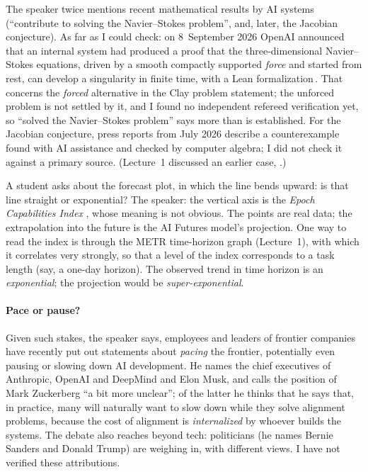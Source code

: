 \begin{beyond}
The speaker twice mentions recent mathematical results by AI systems (``contribute to solving the Navier--Stokes problem'', and, later, the Jacobian conjecture). As far as I could check: on 8~September 2026 OpenAI announced that an internal system had produced a proof that the three-dimensional Navier--Stokes equations, driven by a smooth compactly supported \emph{force} and started from rest, can develop a singularity in finite time, with a Lean formalization\,\citep{openai2026ns}. That concerns the \emph{forced} alternative in the Clay problem statement; the unforced problem is not settled by it, and I found no independent refereed verification yet, so ``solved the Navier--Stokes problem'' says more than is established. For the Jacobian conjecture, press reports from July 2026 describe a counterexample found with AI assistance and checked by computer algebra; I did not check it against a primary source. (Lecture~1 discussed an earlier case, \citealp{openai2026unit}.)
\end{beyond}

\begin{discussion}
A student asks about the forecast plot, in which the line bends upward: is that line straight or exponential? The speaker: the vertical axis is the \emph{Epoch Capabilities Index} \citep{epoch2025eci}, whose meaning is not obvious. The points are real data; the extrapolation into the future is the AI Futures model's projection. One way to read the index is through the METR time-horizon graph (Lecture~1), with which it correlates very strongly, so that a level of the index corresponds to a task length (say, a one-day horizon). The observed trend in time horizon is an \emph{exponential}; the projection would be \emph{super-exponential}.
\end{discussion}

\paragraph{Pace or pause?}
Given such stakes, the speaker says, employees and leaders of frontier companies have recently put out statements about \emph{pacing} the frontier, potentially even pausing or slowing down AI development. He names the chief executives of Anthropic, OpenAI and DeepMind and Elon Musk, and calls the position of Mark Zuckerberg ``a bit more unclear''; of the latter he thinks that he says that, in practice, many will naturally want to slow down while they solve alignment problems, because the cost of alignment is \emph{internalized} by whoever builds the systems\flag. The debate also reaches beyond tech: politicians (he names Bernie Sanders and Donald Trump) are weighing in, with different views. I have not verified these attributions.

